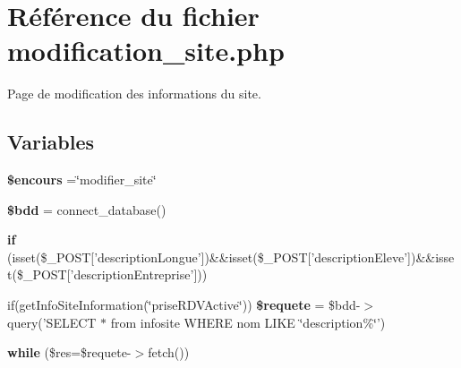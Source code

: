 \hypertarget{modification__site_8php}{\section{Référence du fichier modification\-\_\-site.\-php}
\label{modification__site_8php}
}


Page de modification des informations du site.  


\subsection*{Variables}
\begin{DoxyCompactItemize}
\item 
\hypertarget{modification__site_8php_af7b0e56292699e6983c24fbbf70ce08d}{{\bfseries \$encours} =\char`\"{}modifier\-\_\-site\char`\"{}}\label{modification__site_8php_af7b0e56292699e6983c24fbbf70ce08d}

\item 
\hypertarget{modification__site_8php_a94f91e878bce0991e2cd595c5dd79b3f}{{\bfseries \$bdd} = connect\-\_\-database()}\label{modification__site_8php_a94f91e878bce0991e2cd595c5dd79b3f}

\item 
\hypertarget{modification__site_8php_ad97683d78021f370388582d4859033f2}{{\bfseries if} (isset(\$\-\_\-\-P\-O\-S\-T\mbox{[}'description\-Longue'\mbox{]})\&\&isset(\$\-\_\-\-P\-O\-S\-T\mbox{[}'description\-Eleve'\mbox{]})\&\&isset(\$\-\_\-\-P\-O\-S\-T\mbox{[}'description\-Entreprise'\mbox{]}))}\label{modification__site_8php_ad97683d78021f370388582d4859033f2}

\item 
\hypertarget{modification__site_8php_a495cb0b7764beb4970118e5a0ae62190}{if(get\-Info\-Site\-Information(\char`\"{}prise\-R\-D\-V\-Active\char`\"{})) {\bfseries \$requete} = \$bdd-\/$>$query('S\-E\-L\-E\-C\-T $\ast$ from infosite W\-H\-E\-R\-E nom L\-I\-K\-E \char`\"{}description\%\char`\"{}')}\label{modification__site_8php_a495cb0b7764beb4970118e5a0ae62190}

\item 
\hypertarget{modification__site_8php_abb9024608005245d5e5c1c5de27f9fd5}{{\bfseries while} (\$res=\$requete-\/$>$fetch())}\label{modification__site_8php_abb9024608005245d5e5c1c5de27f9fd5}

\end{DoxyCompactItemize}


